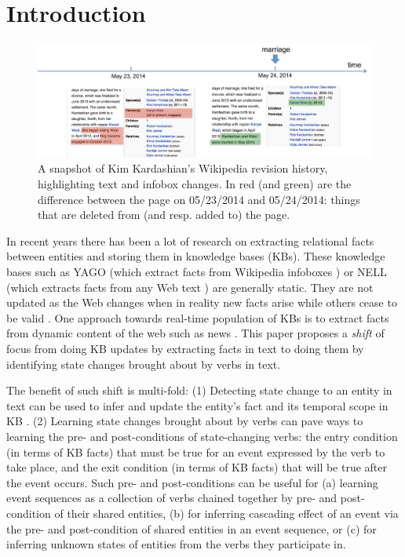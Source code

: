 \section{Introduction}

\begin{figure}[t]
\begin{center}
\includegraphics[width=14cm,keepaspectratio=true]{figures/motivation.pdf}
\caption{\label{fig:motivation} A snapshot of Kim Kardashian's Wikipedia revision history, highlighting text and infobox changes. In red (and green) are the difference between the page on 05/23/2014 and 05/24/2014: things that are deleted from (and resp. added to) the page.}
\end{center}
\end{figure}

In recent years there has been a lot of research on extracting relational facts between entities and storing them in knowledge bases (KBs). These knowledge bases such as YAGO (which extract facts from Wikipedia infoboxes \cite{suchanek2007yago}) or NELL (which extracts facts from any Web text \cite{carlson2010toward,fader2011identifying}) are generally static. They are not updated as the Web changes when in reality new facts arise while others cease to be valid%
. One approach towards real-time population of KBs is to extract facts from dynamic content of the web such as news \cite{nakashole2012real}. This paper proposes a \textit{shift} of focus from doing KB updates by extracting facts in text to doing them by identifying state changes brought about by verbs in text. 

The benefit of such shift is multi-fold: (1) Detecting state change to an entity in text can be used to infer and update the entity's fact and its temporal scope in KB \cite{wijayactp}. (2) Learning state changes brought about by verbs can pave ways to learning the pre- and post-conditions of state-changing verbs: the entry condition (in terms of KB facts) that must be true for an event expressed by the verb to take place, and the exit condition (in terms of KB facts) that will be true after the event occurs. Such pre- and post-conditions can be useful for (a) learning event sequences %
as a collection of verbs chained together by pre- and post-condition of their shared entities, (b) for inferring cascading effect of an event via the pre- and post-condition of shared entities in an event sequence, or (c) for inferring unknown states of entities from the verbs they participate in.  

